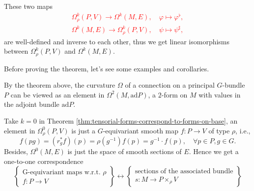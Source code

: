 \begin{theorem}\label{thm:tensorial-forms-correspond-to-forms-on-base}
    These two maps \textcolor{red}{
    \begin{gather*}
        \Omega^k_{\rho}(P, V) \to \Omega^k(M, E), \quad \varphi\mapsto \varphi^\flat,\\
        \Omega^k(M, E) \to \Omega^k_{\rho}(P, V), \quad \psi\mapsto \psi^\sharp,
    \end{gather*}}
    are well-defined and inverse to each other, 
    thus we get linear isomorphisms between $\Omega^k_{\rho}(P, V)$ and $\Omega^k(M, E)$.
\end{theorem}
Before proving the theorem, let's see some examples and corollaries.
\begin{example}
    By the theorem above, the curvature $\Omega$ of a connection on a principal $G$-bundle $P$ 
    can be viewed as an element in $\Omega^2(M,\mathrm{ad}P)$, 
    a $2$-form on $M$ with values in the adjoint bundle $\mathrm{ad}P$.
\end{example}
\begin{corollary}
    Take $k=0$ in Theorem \ref{thm:tensorial-forms-correspond-to-forms-on-base}, 
    an element in $\Omega^0_{\rho}(P, V)$ is just a $G$-equivariant smooth map $f: P\to V$ of type $\rho$, i.e., 
    \begin{equation*}
        f(pg) = (r_g^*f)(p) = \rho(g^{-1})f(p) = g^{-1}\cdot f(p), \quad \forall p\in P, g\in G.
    \end{equation*}
    Besides, $\Omega^0(M, E)$ is just the space of smooth sections of $E$. Hence we get a one-to-one correspondence 
    \begin{equation*}
        \left\{
            \begin{array}{c}
                \text{G-equivariant maps w.r.t. $\rho$} \\[2pt]
                f: P \to V
            \end{array}
        \right\}
        \longleftrightarrow
        \left\{
            \begin{array}{c}
                \text{sections of the associated bundle} \\[2pt]
                s: M \to P \times_\rho V
            \end{array}
        \right\}
    \end{equation*}
\end{corollary}

